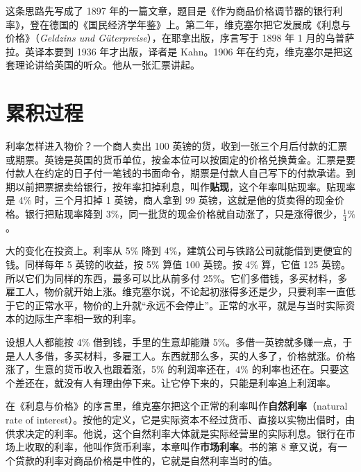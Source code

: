 这条思路先写成了 1897 年的一篇文章，题目是《作为商品价格调节器的银行利率》，登在德国的《国民经济学年鉴》上\cite{fisher1911}。第二年，维克塞尔把它发展成《利息与价格》（\emph{Geldzins und Güterpreise}），在耶拿出版，序言写于 1898 年 1 月的乌普萨拉\cite{wicksell1907,wicksell1936}。英译本要到 1936 年才出版，译者是 Kahn\cite{wicksell1936}。1906 年在约克，维克塞尔是把这套理论讲给英国的听众。他从一张汇票讲起。

\section{累积过程}\label{sec:wicksell-cumulative}

利率怎样进入物价？一个商人卖出 100 英镑的货，收到一张三个月后付款的汇票或期票\cite{wicksell1907}。英镑是英国的货币单位，按金本位可以按固定的价格兑换黄金。汇票是要付款人在约定的日子付一笔钱的书面命令，期票是付款人自己写下的付款承诺。到期以前把票据卖给银行，按年率扣掉利息，叫作\textbf{贴现}，这个年率叫贴现率。贴现率是 4\% 时，三个月扣掉 1 英镑，商人拿到 99 英镑，这就是他的货卖得的现金价格\cite{wicksell1907}。银行把贴现率降到 3\%，同一批货的现金价格就自动涨了，只是涨得很少，$\tfrac14\%$\cite{wicksell1907}。

大的变化在投资上。利率从 5\% 降到 4\%，建筑公司与铁路公司就能借到更便宜的钱\cite{wicksell1907}。同样每年 5 英镑的收益，按 5\% 算值 100 英镑。按 4\% 算，它值 125 英镑。所以它们为同样的东西，最多可以比从前多付 25\%\cite{wicksell1907}。它们多借钱，多买材料，多雇工人，物价就开始上涨。维克塞尔说，不论起初涨得多还是少，只要利率一直低于它的正常水平，物价的上升就“永远不会停止”\cite{wicksell1907}。正常的水平，就是与当时实际资本的边际生产率相一致的利率\cite{wicksell1907}。

\begin{intuition}[借 4\% 的钱，赚 5\% 的利润]
设想人人都能按 4\% 借到钱，手里的生意却能赚 5\%。多借一英镑就多赚一点，于是人人多借，多买材料，多雇工人。东西就那么多，买的人多了，价格就涨。价格涨了，生意的货币收入也跟着涨，5\% 的利润率还在，4\% 的利率也还在。只要这个差还在，就没有人有理由停下来。让它停下来的，只能是利率追上利润率。
\end{intuition}

在《利息与价格》的序言里，维克塞尔把这个正常的利率叫作\textbf{自然利率}（natural rate of interest）。按他的定义，它是实际资本不经过货币、直接以实物出借时，由供求决定的利率\cite{wicksell1936}。他说，这个自然利率大体就是实际经营里的实际利息\cite{wicksell1936}。银行在市场上收取的利率，他叫作货币利率，本章叫作\textbf{市场利率}。书的第 8 章又说，有一个贷款的利率对商品价格是中性的，它就是自然利率当时的值\cite{wicksell1936}。

